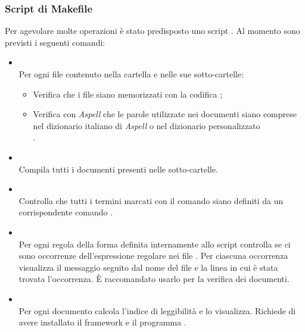		\subsubsection{Script di Makefile}
		\label{makefile}

Per agevolare molte operazioni è stato predisposto uno script . Al momento sono previsti i seguenti comandi:
\begin{itemize}

\item \textbf{} \\
Per ogni file  contenuto nella cartella e nelle sue sotto-cartelle:
\begin{itemize}
	\item Verifica che i file siano memorizzati con la codifica ;
	\item Verifica con \emph{Aspell} che le parole utilizzate nei documenti siano comprese nel dizionario italiano di \emph{Aspell} o nel dizionario personalizzato \\
	.
\end{itemize}
	
\item \textbf{} \\
Compila tutti i documenti presenti nelle sotto-cartelle.

\item \textbf{} \\
Controlla che tutti i termini marcati con il comando \code{\\glossario\{\dots\}} siano definiti da un corrispondente comando .

\item \textbf{} \\
Per ogni regola della forma  definita internamente allo script controlla se ci sono occorrenze dell'espressione regolare  nei file . Per ciascuna occorrenza visualizza il messaggio  seguito dal nome del file e la linea in cui è stata trovata l'occorrenza. È raccomandato usarlo per la verifica dei documenti.

\item \textbf{} \\
Per ogni documento  calcola l'indice di leggibilità  e lo visualizza. Richiede di avere installato il framework  e il programma .

\end{itemize}

